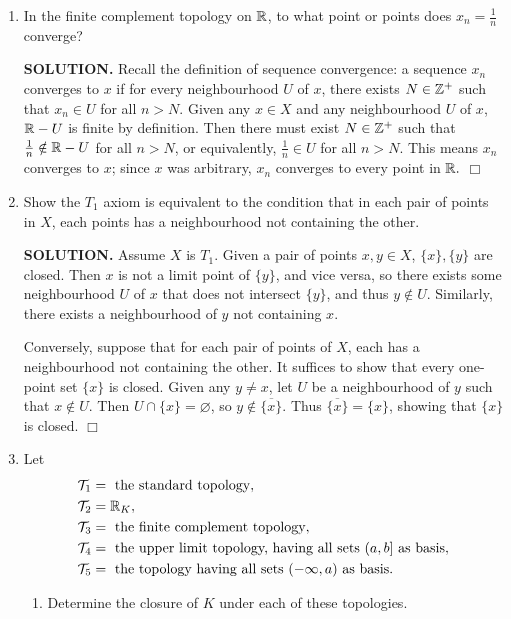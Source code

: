\documentclass{article}
\begin{document}
\begin{enumerate}
    \item In the finite complement topology on $\mathbb{R}$, to what point or points does $x_n = \frac1n$ converge?

    {\bf SOLUTION.} Recall the definition of sequence convergence: a sequence $x_n$ converges to $x$ if for every neighbourhood $U$ of $x$, there exists $N \in \mathbb{Z}^+$ such that $x_n \in U$ for all $n>N$. Given any $x \in X$ and any neighbourhood $U$ of $x$, $\mathbb{R} - U$ is finite by definition. Then there must exist $N \in \mathbb{Z}^+$ such that $\frac1n \notin \mathbb{R} - U$ for all $n > N$, or equivalently, $\frac1n \in U$ for all $n > N$. This means $x_n$ converges to $x$; since $x$ was arbitrary, $x_n$ converges to every point in $\mathbb{R}.$ $\Box$

    \item Show the $T_1$ axiom is equivalent to the condition that in each pair of points in $X$, each points has a neighbourhood not containing the other.

    {\bf SOLUTION.} Assume $X$ is $T_1$. Given a pair of points $x, y \in X$, $\{x\}, \{y\}$ are closed. Then $x$ is not a limit point of $\{y\}$, and vice versa, so there exists some neighbourhood $U$ of $x$ that does not intersect $\{y\}$, and thus $y \notin U$. Similarly, there exists a neighbourhood of $y$ not containing $x$.

    Conversely, suppose that for each pair of points of $X$, each has a neighbourhood not containing the other. It suffices to show that every one-point set $\{x\}$ is closed. Given any $y \neq x$, let $U$ be a neighbourhood of $y$ such that $x \notin U$. Then $U \cap \{x\} = \varnothing$, so $y \notin \overline{\{x\}}$. Thus $\overline{\{x\}} = \{x\}$, showing that $\{x\}$ is closed. $\Box$

    \item Let 
    \begin{align*}
        \mathcal{T}_1 &= \text{ the standard topology}, \\
        \mathcal{T}_2 &= \mathbb{R}_K, \\
        \mathcal{T}_3 &= \text{ the finite complement topology}, \\
        \mathcal{T}_4 &= \text{ the upper limit topology, having all sets }(a, b] \text{ as basis}, \\
        \mathcal{T}_5 &= \text{ the topology having all sets } (-\infty, a) \text{ as basis}.
    \end{align*}
    \begin{enumerate}
        \item Determine the closure of $K$ under each of these topologies.


\end{enumerate}
\end{enumerate}
\end{document}
